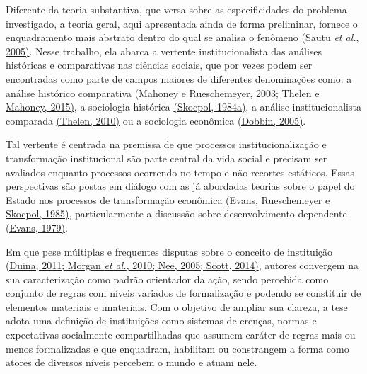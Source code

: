 Diferente da teoria substantiva, que versa sobre as especificidades do
problema investigado, a teoria geral, aqui apresentada ainda de forma
preliminar, fornece o enquadramento mais abstrato dentro do qual se
analisa o fenômeno
\href{https://www.zotero.org/google-docs/?YuggLP}{(Sautu \emph{et al.},
2005)}. Nesse trabalho, ela abarca a vertente institucionalista das
análises históricas e comparativas nas ciências sociais, que por vezes
podem ser encontradas como parte de campos maiores de diferentes
denominações como: a análise histórico comparativa
\href{https://www.zotero.org/google-docs/?apTiPh}{(Mahoney e
Rueschemeyer, 2003; Thelen e Mahoney, 2015)}, a sociologia histórica
\href{https://www.zotero.org/google-docs/?OrkRyO}{(Skocpol, 1984a)}, a
análise institucionalista comparada
\href{https://www.zotero.org/google-docs/?fkkDeO}{(Thelen, 2010)} ou a
sociologia econômica
\href{https://www.zotero.org/google-docs/?cd8zSi}{(Dobbin, 2005)}.

Tal vertente é centrada na premissa de que processos institucionalização
e transformação institucional são parte central da vida social e
precisam ser avaliados enquanto processos ocorrendo no tempo e não
recortes estáticos. Essas perspectivas são postas em diálogo com as já
abordadas teorias sobre o papel do Estado nos processos de transformação
econômica \href{https://www.zotero.org/google-docs/?Yfh3Nf}{(Evans,
Rueschemeyer e Skocpol, 1985)}, particularmente a discussão sobre
desenvolvimento dependente
\href{https://www.zotero.org/google-docs/?DYrm0Y}{(Evans, 1979)}.

Em que pese múltiplas e frequentes disputas sobre o conceito de
instituição \href{https://www.zotero.org/google-docs/?QiRe92}{(Duina,
2011; Morgan \emph{et al.}, 2010; Nee, 2005; Scott, 2014)}, autores
convergem na sua caracterização como padrão orientador da ação, sendo
percebida como conjunto de regras com níveis variados de formalização e
podendo se constituir de elementos materiais e imateriais. Com o
objetivo de ampliar sua clareza, a tese adota uma definição de
instituições como sistemas de crenças, normas e expectativas socialmente
compartilhadas que assumem caráter de regras mais ou menos formalizadas
e que enquadram, habilitam ou constrangem a forma como atores de
diversos níveis percebem o mundo e atuam nele.

